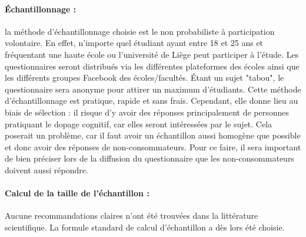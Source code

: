 \paragraph{Échantillonnage :} la méthode d'échantillonnage choisie est le non
probabiliste à participation volontaire. En effet, n'importe quel
étudiant ayant entre 18 et 25 ans et fréquentant une haute école ou
l'université de Liège peut participer à l'étude. Les questionnaires
seront distribués via les différentes plateformes des écoles ainsi que
les différents groupes Facebook des écoles/facultés. Étant un sujet
"tabou", le questionnaire sera anonyme pour attirer un maximum
d'étudiants.
Cette méthode d'échantillonnage est pratique, rapide et sans frais. Cependant, elle donne lieu au biais de sélection : il risque d'y avoir des réponses principalement de personnes pratiquant le dopage cognitif, car elles seront intéressées par le sujet. Cela poserait un problème, car il faut avoir un échantillon aussi homogène que possible et donc avoir des réponses de non-consommateurs. Pour ce faire, il sera important de bien préciser lors de la diffusion du questionnaire que les non-consommateurs doivent aussi répondre.


\paragraph{Calcul de la taille de l'échantillon : }

Aucune recommandations claires n'ont été trouvées dans la littérature scientifique. La formule standard de calcul d'échantillon a dès lors été choisie.

